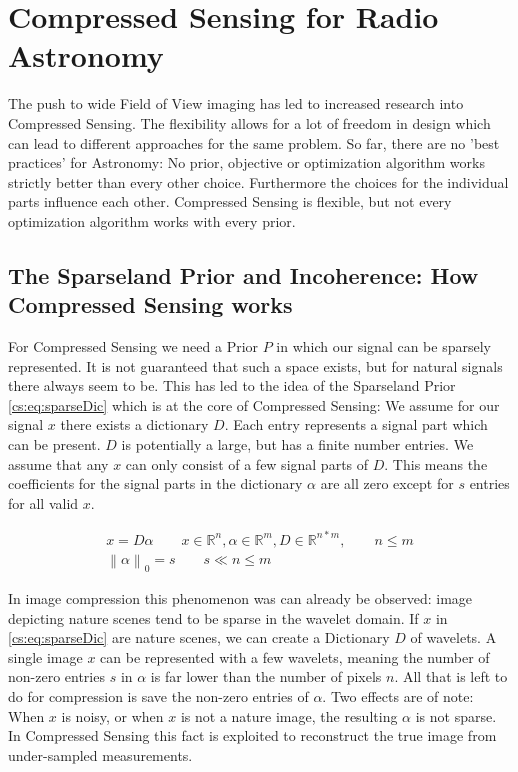 \section{Compressed Sensing for Radio Astronomy} \label{cs}
The push to wide Field of View imaging has led to increased research into Compressed Sensing. The flexibility allows for a lot of freedom in design which can lead to different approaches for the same problem. So far, there are no 'best practices' for Astronomy: No prior, objective or optimization algorithm works strictly better than every other choice. Furthermore the choices for the individual parts influence each other. Compressed Sensing is flexible, but not every optimization algorithm works with every prior.



\subsection{The Sparseland Prior and Incoherence: How Compressed Sensing works}
For Compressed Sensing we need a Prior $P$ in which our signal can be sparsely represented. It is not guaranteed that such a space exists, but for natural signals there always seem to be. This has led to the idea of the Sparseland Prior \eqref{cs:eq:sparseDic} which is at the core of Compressed Sensing: We assume for our signal $x$ there exists a dictionary $D$. Each entry represents a signal part which can be present. $D$ is potentially a large, but has a finite number entries. We assume that any $x$ can only consist of a few signal parts of $D$. This means the coefficients for the signal parts in the dictionary $\alpha$ are all zero except for $s$ entries for all valid $x$. 

\begin{equation} \label{cs:eq:sparseDic}
	\begin{split}
		x = D \alpha  \qquad  x \in \mathbb{R}^{n}, \alpha \in \mathbb{R}^{m}, D \in \mathbb{R}^{n*m}, \qquad n \leq m \\
		\left \| \alpha \right \|_0 = s \qquad s \ll n \leq m
	\end{split}
\end{equation}

In image compression this phenomenon was can already be observed: image depicting nature scenes tend to be sparse in the wavelet domain. If $x$ in \eqref{cs:eq:sparseDic} are nature scenes, we can create a Dictionary $D$ of wavelets. A single image $x$ can be represented with a few wavelets, meaning the number of non-zero entries $s$ in $\alpha$ is far lower than the number of pixels $n$. All that is left to do for compression is save the non-zero entries of $\alpha$. Two effects are of note: When $x$ is noisy, or when $x$ is not a nature image, the resulting $\alpha$ is not sparse. In Compressed Sensing this fact is exploited to reconstruct the true image from under-sampled measurements.

